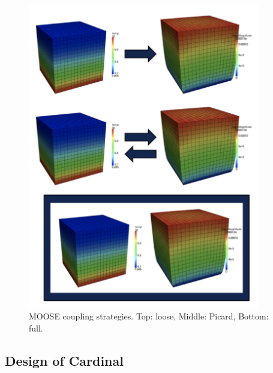 \begin{figure}[!h]
\centering
\includegraphics[clip=true,width=0.9\textwidth]{Figures/moose3}
\caption{MOOSE coupling strategies. Top: loose, Middle: Picard, Bottom: full.}
\label{f:moose3}
\end{figure}

\subsection{Design of Cardinal}
\label{ss:c1}

